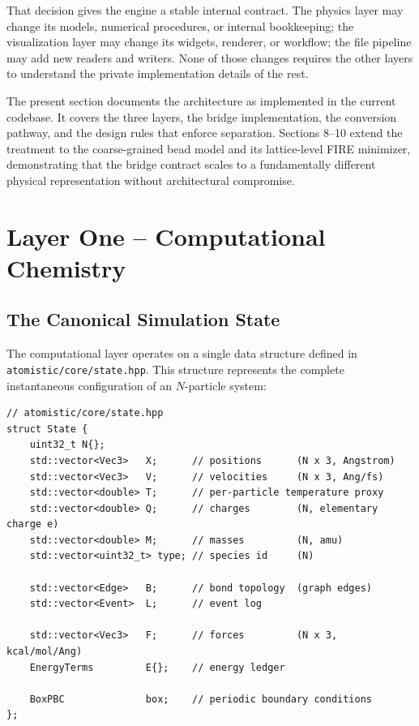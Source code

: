 ﻿\documentclass[11pt]{article}
\newcommand{\file}[1]{\texttt{#1}}
\begin{document}
That decision gives the engine a stable internal contract. The physics layer
may change its models, numerical procedures, or internal bookkeeping; the
visualization layer may change its widgets, renderer, or workflow; the file
pipeline may add new readers and writers. None of those changes requires the
other layers to understand the private implementation details of the rest.

The present section documents the architecture as implemented in the current
codebase. It covers the three layers, the bridge implementation, the
conversion pathway, and the design rules that enforce separation. Sections
8--10 extend the treatment to the coarse-grained bead model and its
lattice-level FIRE minimizer, demonstrating that the bridge contract scales
to a fundamentally different physical representation without architectural
compromise.
\section{Layer One -- Computational Chemistry}

\subsection{The Canonical Simulation State}

The computational layer operates on a single data structure defined in
\file{atomistic/core/state.hpp}. This structure represents the complete
instantaneous configuration of an $N$-particle system:

\begin{lstlisting}
// atomistic/core/state.hpp
struct State {
    uint32_t N{};
    std::vector<Vec3>   X;      // positions      (N x 3, Angstrom)
    std::vector<Vec3>   V;      // velocities     (N x 3, Ang/fs)
    std::vector<double> T;      // per-particle temperature proxy
    std::vector<double> Q;      // charges        (N, elementary charge e)
    std::vector<double> M;      // masses         (N, amu)
    std::vector<uint32_t> type; // species id     (N)

    std::vector<Edge>   B;      // bond topology  (graph edges)
    std::vector<Event>  L;      // event log

    std::vector<Vec3>   F;      // forces         (N x 3, kcal/mol/Ang)
    EnergyTerms         E{};    // energy ledger

    BoxPBC              box;    // periodic boundary conditions
};
\end{lstlisting}
\end{document}

